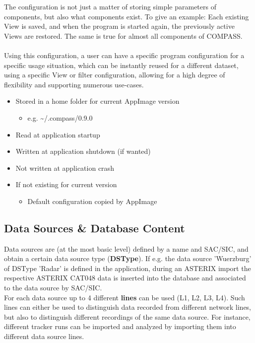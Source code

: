 The configuration is not just a matter of storing simple parameters of components, but also what components exist. To give an example: Each existing View is saved, and when the program is started again, the previously active Views are restored. The same is true for almost all components of COMPASS. \\\\

Using this configuration, a user can have a specific program configuration for a specific usage situation, which can be instantly reused for a different dataset, using a specific View or filter configuration, allowing for a high degree of flexibility and supporting numerous use-cases. \\


\begin{itemize}
\item Stored in a home folder for current AppImage version
\begin{itemize}
\item e.g. \textasciitilde/.compass/0.9.0
\end{itemize}
\item Read at application startup
\item Written at application shutdown (if wanted)
\item Not written at application crash
\item If not existing for current version
\begin{itemize}
\item Default configuration copied by AppImage
\end{itemize}
\end{itemize}

\subsection*{Data Sources \& Database Content}

Data sources are (at the most basic level) defined by a name and SAC/SIC, and obtain a certain data source type (\textbf{DSType}). 
If e.g. the data source 'Wuerzburg' of DSType 'Radar' is defined in the application, during an ASTERIX import the respective ASTERIX CAT048 data is inserted into the database and associated to the data source by SAC/SIC. \\

For each data source up to 4 different \textbf{lines} can be used (L1, L2, L3, L4). 
Such lines can either be used to distinguish data recorded from different network lines, but also to distinguish different recordings of the same data source. 
For instance, different tracker runs can be imported and analyzed by importing them into different data source lines. \\

